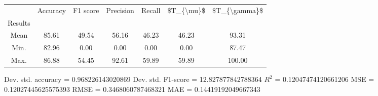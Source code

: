 \begin{tabular}{|c|c|c|c|c|c|c|}
\toprule
{} &  Accuracy &  F1 score &  Precision &  Recall &  \$T\_\{\textbackslash mu\}\$ &  \$T\_\{\textbackslash gamma\}\$ \\
Results &           &           &            &         &            &               \\
\hline
Mean    &     85.61 &     49.54 &      56.16 &   46.23 &      46.23 &         93.31 \\
Min.    &     82.96 &      0.00 &       0.00 &    0.00 &       0.00 &         87.47 \\
Max.    &     86.88 &     54.45 &      92.61 &   59.89 &      59.89 &        100.00 \\
\bottomrule
\end{tabular}

 Dev. std. accuracy = 0.968226143020869
 Dev. std. F1-score = 12.827877842788364
 $R^2$ = 0.12047474120661206
 MSE = 0.12027445625575393
 RMSE = 0.3468060787468321
 MAE = 0.14419192049667343